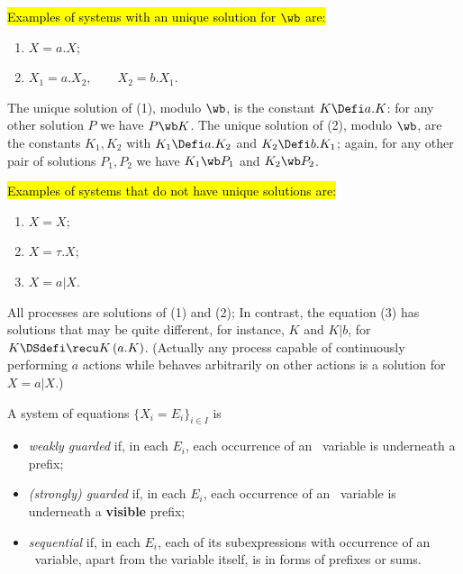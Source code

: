  \begin{example}
\hl{Examples of systems with an unique solution for $\wb$ are:}
\begin{enumerate}[(1)]
\item $X = a. X$;
\item $X_1 = a.  X_2,\qquad X_2 = b.  X_1$\enspace.
\end{enumerate}
\end{example}
The unique solution of (1), modulo $\wb$, is the
constant $K \Defi a. K$:
for any other solution $P$ we have $P \wb K$.
The unique solution of (2), modulo $\wb$, are the constants $K_1 , K_2$
with $K_1 \Defi a . K_2$ and $K_2 \Defi b. K_1$; again, for any other
pair of solutions $P_1,P_2$ we have $K_1 \wb P_1$ and $K_2 \wb P_2$.

\begin{example}
\hl{Examples of systems that do not have unique solutions are:}
\begin{enumerate}[(1)]
\item $X = X$;
\item $X = \tau . X$;
\item $X = a | X$\enspace.
\end{enumerate}
\end{example}
All processes are solutions of (1) and (2);
In contrast, the equation (3) has solutions that may be quite different, for instance,
 $K$ and $K | b$, for $K \DSdefi \recu K {\, (a. K)}$. (Actually any process capable of
continuously performing $a$ actions while behaves arbitrarily on
other actions is a solution for $X = a|  X$.)

\begin{definition}
\label{def:guardness}
A system of equations 
$\{  X_i = E_i\}_{i\in I}$
 is 
\begin{itemize}
\item \emph{weakly guarded} if, in each $E_i$, each occurrence of
  an \behav\  variable is underneath a prefix;

\item \emph{(strongly) guarded} if, in each $E_i$, each occurrence of
  an \behav\  variable is underneath a \textbf{visible} prefix;

\item \emph{sequential} if, in each $E_i$, each of its subexpressions with occurrence of
  an \behav\  variable, apart from the variable itself, is in forms of
  prefixes or sums.
\end{itemize}
\end{definition}

